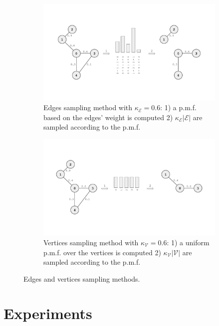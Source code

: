 \documentclass{article}
\begin{document}
\begin{figure}[h!] 
    \centering
    \begin{subfigure}[b]{0.48\textwidth}
        \centering
        \includegraphics[width=\textwidth]{Images/edge_sampling.pdf}
        \caption{Edges sampling method with $\kappa_\mathcal{E} = 0.6$: 1) a p.m.f. based on the edges' weight is computed 2) $\kappa_\mathcal{E} |\mathcal{E}|$ are sampled according to the p.m.f.}
    \end{subfigure}
    \hfill
    \begin{subfigure}[b]{0.48\textwidth}
        \centering
        \includegraphics[width=\textwidth]{Images/vertex_sampling.pdf}
        \caption{Vertices sampling method with $\kappa_\mathcal{V} = 0.6$: 1) a uniform p.m.f. over the vertices is computed 2) $\kappa_\mathcal{V} |\mathcal{V}|$ are sampled according to the p.m.f.}
    \end{subfigure}
    \caption{Edges and vertices sampling methods.}
    \label{fig:sampling}
\end{figure}

\section{Experiments} \label{sec:experiments}
\end{document}
